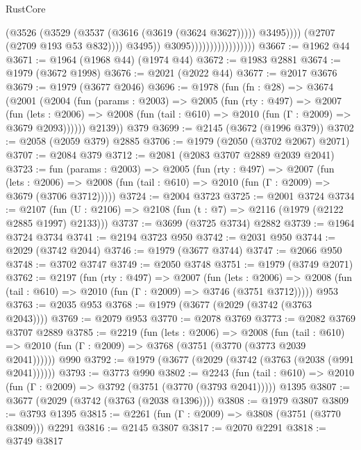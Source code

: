 \begin{lexlean}{RustCore}
\begin{coremodule}
                                                    (@3526
                                                      (@3529 (@3537 (@3616 (@3619 (@3624 @3627)))))
                                                      @3495))))
                                              (@2707 (@2709 @193 @53 @832))))
                                          @3495))
                                      @3095)))))))))))))))))
@3667 := @1962 @44
@3671 := @1964 (@1968 @44) (@1974 @44)
@3672 := @1983 @2881
@3674 := @1979 (@3672 @1998)
@3676 := @2021 (@2022 @44)
@3677 := @2017 @3676
@3679 := @1979 (@3677 @2046)
@3696 := @1978
    (fun (fn : @28) =>
    @3674
      (@2001
        (@2004
          (fun (params : @2003) =>
          @2005
            (fun (rty : @497) =>
            @2007
              (fun (lets : @2006) =>
              @2008 (fun (tail : @610) => @2010 (fun (Γ : @2009) => @3679 @2093))))))
        @2139))
    @379
@3699 := @2145 (@3672 (@1996 @379))
@3702 := @2058 (@2059 @379) @2885
@3706 := @1979 (@2050 (@3702 @2067) @2071)
@3707 := @2084 @379
@3712 := @2081 (@2083 @3707 @2889 @2039 @2041)
@3723 := fun (params : @2003) =>
  @2005
    (fun (rty : @497) =>
    @2007
      (fun (lets : @2006) =>
      @2008 (fun (tail : @610) => @2010 (fun (Γ : @2009) => @3679 (@3706 @3712)))))
@3724 := @2004 @3723
@3725 := @2001 @3724
@3734 := @2107 (fun (U : @2106) => @2108 (fun (t : @7) => @2116 (@1979 (@2122 @2885 @1997) @2133)))
@3737 := @3699 (@3725 @3734) @2882
@3739 := @1964 @3724 @3734
@3741 := @2194 @3723 @950
@3742 := @2031 @950
@3744 := @2029 (@3742 @2044)
@3746 := @1979 (@3677 @3744)
@3747 := @2066 @950
@3748 := @3702 @3747
@3749 := @2050 @3748
@3751 := @1979 (@3749 @2071)
@3762 := @2197
    (fun (rty : @497) =>
    @2007
      (fun (lets : @2006) =>
      @2008 (fun (tail : @610) => @2010 (fun (Γ : @2009) => @3746 (@3751 @3712)))))
    @953
@3763 := @2035 @953
@3768 := @1979 (@3677 (@2029 (@3742 (@3763 @2043))))
@3769 := @2079 @953
@3770 := @2078 @3769
@3773 := @2082 @3769 @3707 @2889
@3785 := @2219
    (fun (lets : @2006) =>
    @2008
      (fun (tail : @610) => @2010 (fun (Γ : @2009) => @3768 (@3751 (@3770 (@3773 @2039 @2041))))))
    @990
@3792 := @1979 (@3677 (@2029 (@3742 (@3763 (@2038 (@991 @2041))))))
@3793 := @3773 @990
@3802 := @2243
    (fun (tail : @610) => @2010 (fun (Γ : @2009) => @3792 (@3751 (@3770 (@3793 @2041)))))
    @1395
@3807 := @3677 (@2029 (@3742 (@3763 (@2038 @1396))))
@3808 := @1979 @3807
@3809 := @3793 @1395
@3815 := @2261 (fun (Γ : @2009) => @3808 (@3751 (@3770 @3809))) @2291
@3816 := @2145 @3807
@3817 := @2070 @2291
@3818 := @3749 @3817

\end{coremodule}
\end{lexlean}
